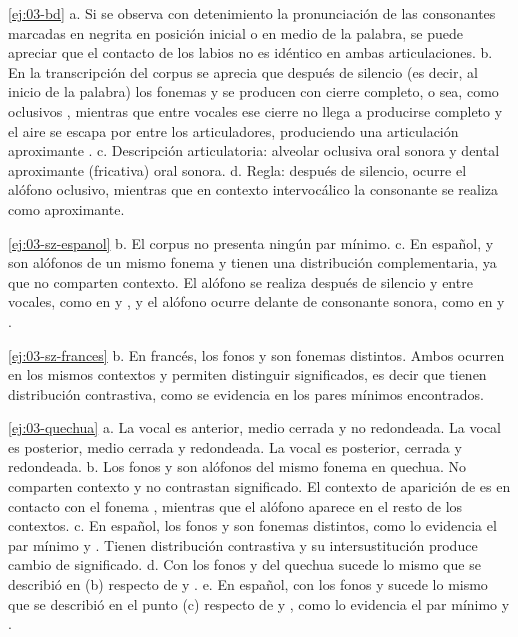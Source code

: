 \begin{solucion}{\ref{ej:03-bd}}
a. Si se observa con detenimiento la pronunciación de las consonantes marcadas
en negrita en posición inicial o en medio de la palabra, se puede apreciar que
el contacto de los labios no es idéntico en ambas articulaciones. b. En la
transcripción del corpus se aprecia que después de silencio (es decir, al inicio
de la palabra) los fonemas  y  se producen con cierre completo,
o sea, como oclusivos  , mientras que entre vocales ese cierre no
llega a producirse completo y el aire se escapa por entre los articuladores,
produciendo una articulación aproximante  . c. Descripción
articulatoria:  alveolar oclusiva oral sonora y  dental
aproximante (fricativa) oral sonora. d. Regla: después de silencio, ocurre el
alófono oclusivo, mientras que en contexto intervocálico la consonante se
realiza como aproximante.
\end{solucion}

\begin{solucion}{\ref{ej:03-sz-espanol}}
b. El corpus no presenta ningún par mínimo. c. En español,  y 
son alófonos de un mismo fonema y tienen una distribución complementaria, ya que
no comparten contexto. El alófono  se realiza después de silencio y entre
vocales, como en  y , y el alófono  ocurre delante
de consonante sonora, como en  y .
\end{solucion}

\begin{solucion}{\ref{ej:03-sz-frances}}
b. En francés, los fonos  y  son fonemas distintos. Ambos ocurren
en los mismos contextos y permiten distinguir significados, es decir que tienen
distribución contrastiva, como se evidencia en los pares mínimos encontrados.
\end{solucion}

\begin{solucion}{\ref{ej:03-quechua}}
a. La vocal  es anterior, medio cerrada y no redondeada. La vocal 
es posterior, medio cerrada y redondeada. La vocal  es posterior, cerrada
y redondeada. b. Los fonos  y  son alófonos del mismo fonema en
quechua. No comparten contexto y no contrastan significado. El contexto de
aparición de  es en contacto con el fonema , mientras que el
alófono  aparece en el resto de los contextos. c. En español, los fonos
 y  son fonemas distintos, como lo evidencia el par mínimo
 y . Tienen distribución contrastiva y su
intersustitución produce cambio de significado. d. Con los fonos  y
 del quechua sucede lo mismo que se describió en (b) respecto de 
y . e. En español, con los fonos  y  sucede lo mismo que se
describió en el punto (c) respecto de  y , como lo evidencia el
par mínimo  y .
\end{solucion}

